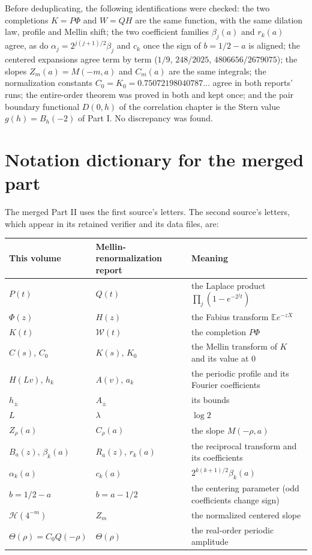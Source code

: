 \documentclass[11pt,a4paper,oneside,openany]{book}
\numberwithin{equation}{chapter}
\theoremstyle{definition}
\theoremstyle{remark}
\newcommand{\E}{\mathbb E}
\newcommand{\calH}{\mathcal H}
\begin{document}
Before deduplicating, the following identifications were checked: the two
completions $K=P\Phi$ and $W=QH$ are the same function, with the same
dilation law, profile and Mellin shift; the two coefficient families
$\beta_j(a)$ and $r_k(a)$ agree, as do $\alpha_j=2^{j(j+1)/2}\beta_j$ and
$c_k$ once the sign of $b=1/2-a$ is aligned; the centered expansions agree
term by term ($1/9$, $248/2025$, $4806656/2679075$); the slopes
$Z_m(a)=M(-m,a)$ and $C_m(a)$ are the same integrals; the normalization
constants $C_0=K_0=0.75072198040787\ldots$ agree in both reports' runs; the
entire-order theorem was proved in both and kept once; and the pair boundary
functional $D(0,h)$ of the correlation chapter is the Stern value
$g(h)=B_h(-2)$ of Part I. No discrepancy was found.

\section{Notation dictionary for the merged part}
The merged Part II uses the first source's letters. The second source's
letters, which appear in its retained verifier and its data files, are:
\begin{center}\small
\begin{tabular}{@{}lll@{}}
\toprule
This volume & Mellin-renormalization report & Meaning\\
\midrule
$P(t)$ & $Q(t)$ & the Laplace product $\prod_j(1-e^{-2^jt})$\\
$\Phi(z)$ & $H(z)$ & the Fabius transform $\E e^{-zX}$\\
$K(t)$ & $\mathcal W(t)$ & the completion $P\Phi$\\
$C(s)$, $C_0$ & $K(s)$, $K_0$ & the Mellin transform of $K$ and its value at $0$\\
$H(Lv)$, $h_k$ & $A(v)$, $a_k$ & the periodic profile and its Fourier coefficients\\
$h_\pm$ & $A_\pm$ & its bounds\\
$L$ & $\lambda$ & $\log2$\\
$Z_\rho(a)$ & $C_\rho(a)$ & the slope $M(-\rho,a)$\\
$B_a(z)$, $\beta_k(a)$ & $R_a(z)$, $r_k(a)$ & the reciprocal transform and its coefficients\\
$\alpha_k(a)$ & $c_k(a)$ & $2^{k(k+1)/2}\beta_k(a)$\\
$b=1/2-a$ & $b=a-1/2$ & the centering parameter (odd coefficients change sign)\\
$\calH(4^{-m})$ & $Z_m$ & the normalized centered slope\\
$\Theta(\rho)=C_0Q(-\rho)$ & $\Theta(\rho)$ & the real-order periodic amplitude\\
\bottomrule
\end{tabular}
\end{center}
\end{document}
